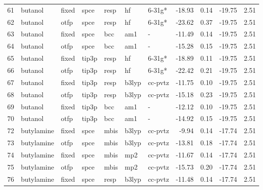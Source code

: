 \begin{tabular}{lllllllrrrr}
61  &                       butanol &  fixed &   spce &   resp &      hf &       6-31g* &      -18.93 &     0.14 &      -19.75 &      2.51 \\
62  &                       butanol &   otfp &   spce &   resp &      hf &       6-31g* &      -23.62 &     0.37 &      -19.75 &      2.51 \\
63  &                       butanol &  fixed &   spce &    bcc &     am1 &            - &      -11.49 &     0.14 &      -19.75 &      2.51 \\
64  &                       butanol &   otfp &   spce &    bcc &     am1 &            - &      -15.28 &     0.15 &      -19.75 &      2.51 \\
65  &                       butanol &  fixed &  tip3p &   resp &      hf &       6-31g* &      -18.89 &     0.11 &      -19.75 &      2.51 \\
66  &                       butanol &   otfp &  tip3p &   resp &      hf &       6-31g* &      -22.42 &     0.21 &      -19.75 &      2.51 \\
67  &                       butanol &  fixed &  tip3p &   resp &   b3lyp &      cc-pvtz &      -11.75 &     0.10 &      -19.75 &      2.51 \\
68  &                       butanol &   otfp &  tip3p &   resp &   b3lyp &      cc-pvtz &      -15.18 &     0.23 &      -19.75 &      2.51 \\
69  &                       butanol &  fixed &  tip3p &    bcc &     am1 &            - &      -12.12 &     0.10 &      -19.75 &      2.51 \\
70  &                       butanol &   otfp &  tip3p &    bcc &     am1 &            - &      -14.92 &     0.15 &      -19.75 &      2.51 \\
72  &                    butylamine &  fixed &   spce &   mbis &   b3lyp &      cc-pvtz &       -9.94 &     0.14 &      -17.74 &      2.51 \\
73  &                    butylamine &   otfp &   spce &   mbis &   b3lyp &      cc-pvtz &      -13.81 &     0.18 &      -17.74 &      2.51 \\
74  &                    butylamine &  fixed &   spce &   mbis &     mp2 &      cc-pvtz &      -11.67 &     0.14 &      -17.74 &      2.51 \\
75  &                    butylamine &   otfp &   spce &   mbis &     mp2 &      cc-pvtz &      -15.73 &     0.20 &      -17.74 &      2.51 \\
76  &                    butylamine &  fixed &   spce &   resp &   b3lyp &      cc-pvtz &      -11.48 &     0.14 &      -17.74 &      2.51 \\

\end{tabular}
